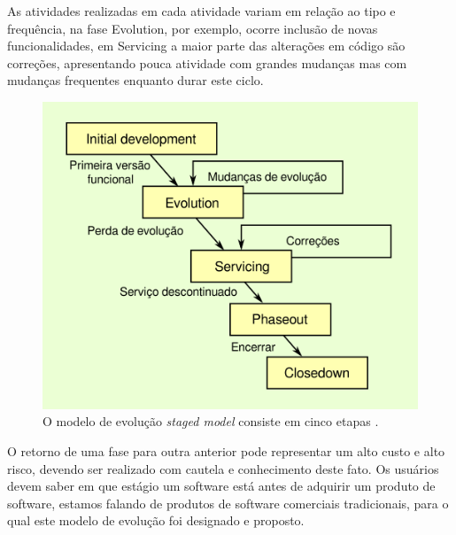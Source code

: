 
As atividades realizadas em cada atividade variam em relação ao tipo e
frequência, na fase Evolution, por exemplo, ocorre inclusão de novas
funcionalidades, em Servicing a maior parte das alterações em código são
correções, apresentando pouca atividade com grandes mudanças mas com mudanças
frequentes enquanto durar este ciclo.

\begin{figure}[h]
  \center
  \includegraphics[scale=0.6]{imagens/staged-model-cycle.png}
  \caption{O modelo de evolução {\it staged model} consiste em cinco etapas \cite{rajlich2000staged}.}
  \label{staged-model-cycle}
\end{figure}

O retorno de uma fase para outra anterior pode representar um alto custo e alto
risco, devendo ser realizado com cautela e conhecimento deste fato. Os
usuários devem saber em que estágio um software está antes de adquirir um
produto de software, estamos falando de produtos de software comerciais
tradicionais, para o qual este modelo de evolução foi designado e proposto.


